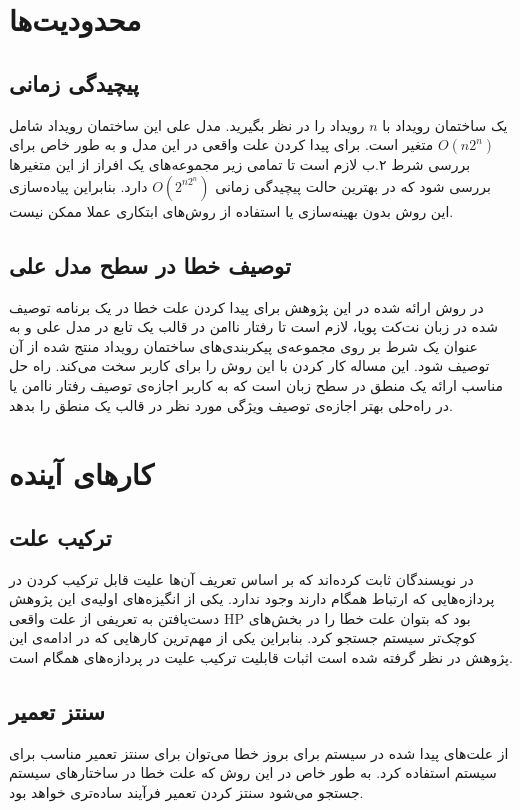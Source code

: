 \section{محدودیت‌ها}
\subsection{پیچیدگی زمانی}
یک ساختمان رویداد با 
$n$
رویداد را در نظر بگیرید.
مدل علی این ساختمان رویداد شامل 
$O(n2^n)$
متغیر است.
برای پیدا کردن علت واقعی در این مدل و به طور خاص برای بررسی شرط ۲.ب لازم است تا تمامی زیر مجموعه‌های یک افراز از این متغیر‌ها بررسی شود که در بهترین حالت پیچیدگی زمانی
$O(2^{n2^n})$
دارد.
بنابراین پیاده‌سازی این روش بدون بهینه‌سازی یا استفاده از روش‌های ابتکاری عملا ممکن نیست.
\subsection{توصیف خطا در سطح مدل علی}
در روش ارائه شده در این پژوهش برای پیدا کردن علت خطا در یک برنامه توصیف شده در زبان نت‌کت پویا، لازم است تا رفتار ناامن در قالب یک تابع در مدل علی و به عنوان یک شرط بر روی مجموعه‌ی پیکربندی‌های ساختمان رویداد منتج شده از‌ آن توصیف شود.
این مساله کار کردن با این روش را برای کاربر سخت می‌کند. 
راه حل مناسب ارائه یک منطق در سطح زبان است که به کاربر اجازه‌ی توصیف رفتار ناامن یا در راه‌حلی بهتر اجازه‌ی توصیف ویژگی مورد نظر در قالب یک منطق را بدهد.

\section{کار‌های آینده}

\subsection{ترکیب علت}
در 
\cite{causal-hml}
نویسندگان ثابت کرده‌اند که بر اساس تعریف آن‌ها علیت قابل ترکیب کردن در پردازه‌هایی که ارتباط همگام دارند وجود ندارد.
یکی از انگیزه‌های اولیه‌ی این پژوهش دست‌یافتن به تعریفی از علت واقعی
HP
بود که بتوان علت خطا را در بخش‌های کوچک‌تر سیستم جستجو کرد.
بنابراین یکی از مهم‌ترین کار‌هایی که در ادامه‌ی این پژوهش در نظر گرفته شده است اثبات قابلیت ترکیب علیت در پردازه‌های همگام است.

\subsection{سنتز تعمیر}
از علت‌های پیدا شده در سیستم برای بروز خطا می‌توان برای سنتز تعمیر مناسب برای سیستم استفاده کرد.
به طور خاص در این روش که علت خطا در ساختار‌های سیستم جستجو می‌شود سنتز کردن تعمیر فرآیند ساده‌تری خواهد بود.
